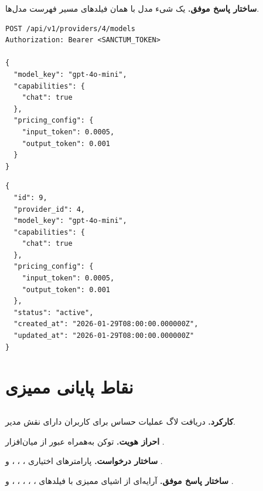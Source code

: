 \textbf{ساختار پاسخ موفق.} یک شیء مدل با همان فیلدهای مسیر فهرست مدل‌ها.

\begin{latin}
\begin{lstlisting}[style=jsonStyle]
POST /api/v1/providers/4/models
Authorization: Bearer <SANCTUM_TOKEN>

{
  "model_key": "gpt-4o-mini",
  "capabilities": {
    "chat": true
  },
  "pricing_config": {
    "input_token": 0.0005,
    "output_token": 0.001
  }
}
\end{lstlisting}
\end{latin}


\begin{latin}
\begin{lstlisting}[style=jsonStyle]
{
  "id": 9,
  "provider_id": 4,
  "model_key": "gpt-4o-mini",
  "capabilities": {
    "chat": true
  },
  "pricing_config": {
    "input_token": 0.0005,
    "output_token": 0.001
  },
  "status": "active",
  "created_at": "2026-01-29T08:00:00.000000Z",
  "updated_at": "2026-01-29T08:00:00.000000Z"
}
\end{lstlisting}
\end{latin}


\section{نقاط پایانی ممیزی}

\subsection{}
\textbf{کارکرد.} دریافت لاگ عملیات حساس برای کاربران دارای نقش مدیر.

\textbf{احراز هویت.} توکن  به‌همراه عبور از میان‌افزار
.

\textbf{ساختار درخواست.} پارامترهای اختیاری ،
، ،  و .

\textbf{ساختار پاسخ موفق.} آرایه‌ای از اشیای ممیزی با فیلدهای ،
، ، ،
،  و .





